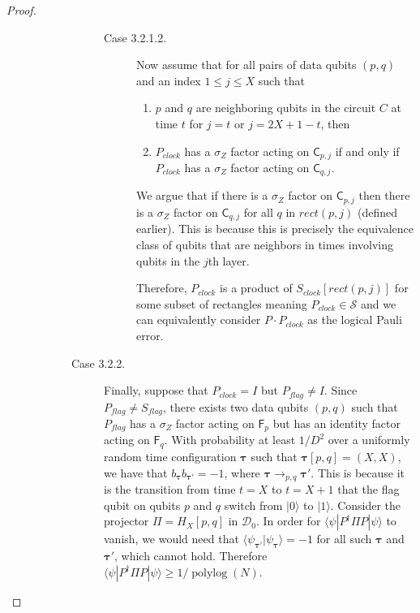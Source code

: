 \documentclass[11pt,letterpaper]{article}
\theoremstyle{definition}
\theoremstyle{remark}
\DeclareMathOperator{\polylog}{polylog}
\newcommand{\cD}{\mathcal D}
\newcommand{\cS}{\mathcal S}
\renewcommand{\leq}{\leqslant}
\renewcommand{\geq}{\geqslant}
\numberwithin{equation}{section}
\theoremstyle{definition}
\newcommand{\ket}[1]{|#1\rangle}
\newcommand{\bra}[1]{\langle#1|}
\newcommand{\ip}[2]{\langle #1 | #2 \rangle}
\newcommand{\sC}{{\mathsf{C}}}
\newcommand{\sF}{{\mathsf{F}}}
\newcommand{\timeconfig}{{\bm{\tau}}}
\begin{document}
\begin{proof}
\begin{description}
\begin{description}
\begin{description}
\begin{description}
  \item[Case 3.2.1.2.]
  Now assume that for all pairs of data qubits $(p,q)$ and an index $1 \leq j \leq X$ such that
  \begin{enumerate}
    \item $p$ and $q$ are neighboring qubits in the circuit $C$ at time $t$ for $j = t$ or $j = 2X + 1 - t$, then
    \item $P_{clock}$ has a $\sigma_Z$ factor acting on $\sC_{p,j}$ if and only if $P_{clock}$ has a $\sigma_Z$ factor acting on $\sC_{q,j}$. 
  \end{enumerate}

  We argue that if there is a $\sigma_Z$ factor on $\sC_{p,j}$ then there is a $\sigma_Z$ factor on $\sC_{q,j}$ for all $q$ in $rect(p,j)$ (defined earlier). This is because this is precisely the equivalence class of qubits that are neighbors in times involving qubits in the $j$th layer. 

  Therefore, $P_{clock}$ is a product of $S_{clock}[rect(p,j)]$ for some subset of rectangles meaning $P_{clock} \in \cS$ and we can equivalently consider $P \cdot P_{clock}$ as the logical Pauli error.

  \end{description}

  \item[Case 3.2.2.] Finally, suppose that $P_{clock} = I$ but $P_{flag} \neq I$. Since $P_{flag} \neq S_{flag}$, there exists two data qubits $(p,q)$ such that $P_{flag}$ has a $\sigma_Z$ factor acting on $\sF_{p}$ but has an identity factor acting on $\sF_q$. With probability at least $1/D^2$ over a uniformly random time configuration $\timeconfig$ such that $\timeconfig[p,q] = (X,X)$, we have that $b_{\timeconfig} b_{\timeconfig'} = -1$, where $\timeconfig \to_{p,q} \timeconfig'$. This is because it is the transition from time $t = X$ to $t = X+1$ that the flag qubit on qubits $p$ and $q$ switch from $\ket{0}$ to $\ket{1}$. Consider the projector $\Pi = H_X[p,q]$ in $\cD_0$. In order for $\bra{\psi}P^\dagger \Pi P \ket{\psi}$ to vanish, we would need that $\ip{\psi_{\timeconfig'}}{\psi_\timeconfig} = -1$ for all such $\timeconfig$ and $\timeconfig'$, which cannot hold. Therefore $\bra{\psi} P^\dagger \Pi P \ket{\psi} \geq 1/\polylog(N)$.

  \end{description}

  \end{description}
\end{description} 
  

\end{proof}
\end{document}
